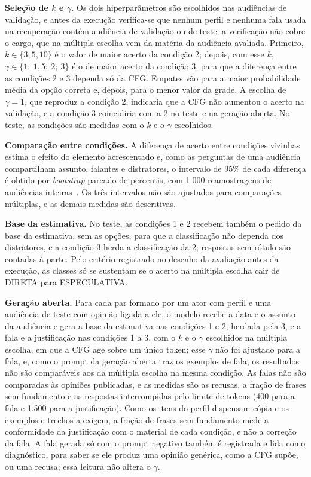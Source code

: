 \textbf{Seleção de $k$ e $\gamma$.} Os dois hiperparâmetros são escolhidos nas audiências de
validação, e antes da execução verifica-se que nenhum perfil e nenhuma fala usada na recuperação
contém audiência de validação ou de teste; a verificação não cobre o cargo, que na múltipla escolha
vem da matéria da audiência avaliada. Primeiro, $k \in \{3, 5, 10\}$ é o valor de maior acerto da
condição 2; depois, com esse $k$, $\gamma \in \{1;\ 1{,}5;\ 2;\ 3\}$ é o de maior acerto da condição 3,
para que a diferença entre as condições 2 e 3 dependa só da CFG. Empates vão para a maior
probabilidade média da opção correta e, depois, para o menor valor da grade. A escolha de
$\gamma = 1$, que reproduz a condição 2, indicaria que a CFG não aumentou o acerto na validação, e a
condição 3 coincidiria com a 2 no teste e na geração aberta. No teste, as condições são medidas com o
$k$ e o $\gamma$ escolhidos.

\textbf{Comparação entre condições.} A diferença de acerto entre condições vizinhas estima o efeito
do elemento acrescentado e, como as perguntas de uma audiência compartilham assunto, falantes e
distratores, o intervalo de 95\% de cada diferença é obtido por \textit{bootstrap} pareado de
percentis, com 1.000 reamostragens de audiências inteiras~\citep{efron1993introduction}. Os três
intervalos não são ajustados para comparações múltiplas, e as demais medidas são descritivas.

\textbf{Base da estimativa.} No teste, as condições 1 e 2 recebem também o pedido da base da
estimativa, sem as opções, para que a classificação não dependa dos distratores, e a condição 3
herda a classificação da 2; respostas sem rótulo são contadas à parte. Pelo critério registrado no
desenho da avaliação antes da execução, as classes só se sustentam se o acerto na múltipla escolha
cair de DIRETA para ESPECULATIVA.

\textbf{Geração aberta.} Para cada par formado por um ator com perfil e uma audiência de teste com
opinião ligada a ele, o modelo recebe a data e o assunto da audiência e gera a base da estimativa nas
condições 1 e 2, herdada pela 3, e a fala e a justificação nas condições 1 a 3, com o $k$ e o
$\gamma$ escolhidos na múltipla escolha, em que a CFG age sobre um único token; esse $\gamma$ não foi
ajustado para a fala, e, como o prompt da geração aberta traz os exemplos de fala, os resultados não
são comparáveis aos da múltipla escolha na mesma condição. As falas não são comparadas às opiniões
publicadas, e as medidas são as recusas, a fração de frases sem fundamento e as respostas
interrompidas pelo limite de tokens (400 para a fala e 1.500 para a justificação). Como os itens do
perfil dispensam cópia e os exemplos e trechos a exigem, a fração de frases sem fundamento mede a
conformidade da justificação com o material de cada condição, e não a correção da fala. A fala gerada
só com o prompt negativo também é registrada e lida como diagnóstico, para saber se ele produz uma
opinião genérica, como a CFG supõe, ou uma recusa; essa leitura não altera o $\gamma$.

